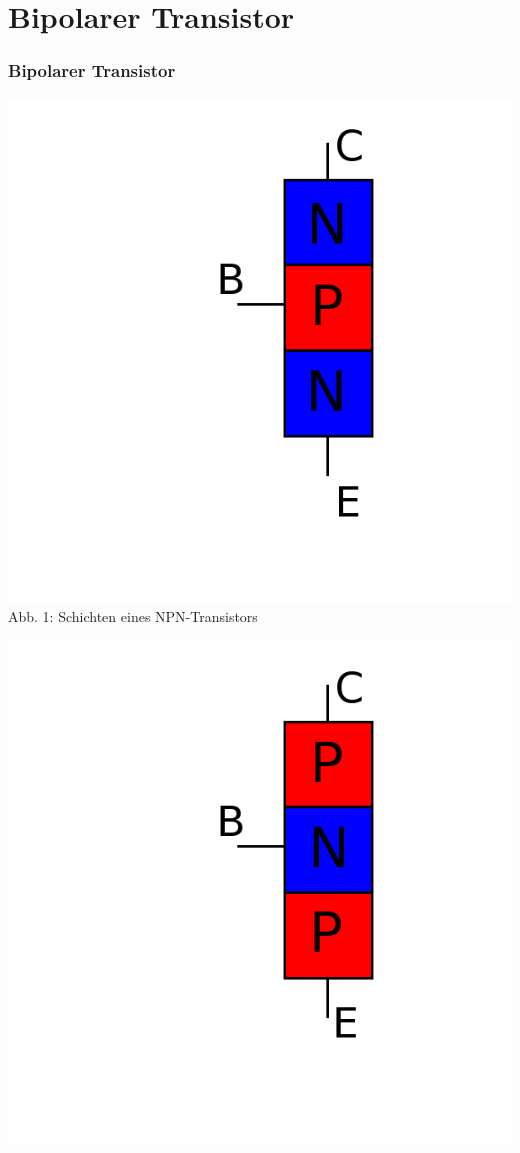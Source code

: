 \section*{Bipolarer Transistor}
\begin{frame}
\frametitle{Bipolarer Transistor}
\begin{minipage}{0.4\textwidth}
	\includegraphics[scale=0.2]{e13/NPN_hlb.png}\\
	Abb. 1: Schichten eines NPN-Transistors
\end{minipage}
\hspace{0.5cm}
\begin{minipage}{0.4\textwidth}
	\includegraphics[scale=0.2 ]{e13/PNP_hlb.png}\\

\end{minipage}
\end{frame}

